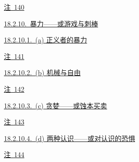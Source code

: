 \par\noindent\hspace*{4.05em}\hyperref[ch18:local:n48]{注~140}\nobreak\dotfill\nobreak\hyperref[ch18:local:n48]{\pageref*{ch18:local:n48}}\par
\par\noindent\hspace*{1.35em}\hyperref[ch18:local:h53]{18.2.10.~暴力——或游戏与刺棒}\nobreak\dotfill\nobreak\hyperref[ch18:local:h53]{\pageref*{ch18:local:h53}}\par
\par\noindent\hspace*{2.70em}\hyperref[ch18:local:h54]{18.2.10.1.~(a) 正义者的暴力}\nobreak\dotfill\nobreak\hyperref[ch18:local:h54]{\pageref*{ch18:local:h54}}\par
\par\noindent\hspace*{4.05em}\hyperref[ch18:local:n49]{注~141}\nobreak\dotfill\nobreak\hyperref[ch18:local:n49]{\pageref*{ch18:local:n49}}\par
\par\noindent\hspace*{2.70em}\hyperref[ch18:local:h55]{18.2.10.2.~(b) 机械与自由}\nobreak\dotfill\nobreak\hyperref[ch18:local:h55]{\pageref*{ch18:local:h55}}\par
\par\noindent\hspace*{4.05em}\hyperref[ch18:local:n50]{注~142}\nobreak\dotfill\nobreak\hyperref[ch18:local:n50]{\pageref*{ch18:local:n50}}\par
\par\noindent\hspace*{2.70em}\hyperref[ch18:local:h56]{18.2.10.3.~(c) 贪婪——或蚀本买卖}\nobreak\dotfill\nobreak\hyperref[ch18:local:h56]{\pageref*{ch18:local:h56}}\par
\par\noindent\hspace*{4.05em}\hyperref[ch18:local:n51]{注~143}\nobreak\dotfill\nobreak\hyperref[ch18:local:n51]{\pageref*{ch18:local:n51}}\par
\par\noindent\hspace*{2.70em}\hyperref[ch18:local:h57]{18.2.10.4.~(d) 两种认识——或对认识的恐惧}\nobreak\dotfill\nobreak\hyperref[ch18:local:h57]{\pageref*{ch18:local:h57}}\par
\par\noindent\hspace*{4.05em}\hyperref[ch18:local:n52]{注~144}\nobreak\dotfill\nobreak\hyperref[ch18:local:n52]{\pageref*{ch18:local:n52}}\par
